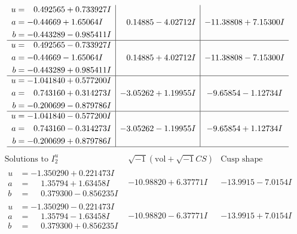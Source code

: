 \documentclass[1p]{elsarticle_modified}
\theoremstyle{definition}
\newcommand{\I}{\sqrt{-1}}
\begin{document}
$$\begin{array}{c|c|c}
\begin{aligned}
u &= \phantom{-}0.492565 + 0.733927 I \\
a &= -0.44669 + 1.65064 I \\
b &= -0.443289 - 0.985411 I\end{aligned}
 & \phantom{-}0.14885 - 4.02712 I & -11.38808 + 7.15300 I \\ \hline\begin{aligned}
u &= \phantom{-}0.492565 - 0.733927 I \\
a &= -0.44669 - 1.65064 I \\
b &= -0.443289 + 0.985411 I\end{aligned}
 & \phantom{-}0.14885 + 4.02712 I & -11.38808 - 7.15300 I \\ \hline\begin{aligned}
u &= -1.041840 + 0.577200 I \\
a &= \phantom{-}0.743160 + 0.314273 I \\
b &= -0.200699 - 0.879786 I\end{aligned}
 & -3.05262 + 1.19955 I & -9.65854 - 1.12734 I \\ \hline\begin{aligned}
u &= -1.041840 - 0.577200 I \\
a &= \phantom{-}0.743160 - 0.314273 I \\
b &= -0.200699 + 0.879786 I\end{aligned}
 & -3.05262 - 1.19955 I & -9.65854 + 1.12734 I\\
 \hline 
 \end{array}$$\newpage$$\begin{array}{c|c|c}  
\text{Solutions to }I^u_{2}& \I (\text{vol} + \sqrt{-1}CS) & \text{Cusp shape}\\
 \hline 
\begin{aligned}
u &= -1.350290 + 0.221473 I \\
a &= \phantom{-}1.35794 + 1.63458 I \\
b &= \phantom{-}0.379300 - 0.856235 I\end{aligned}
 & -10.98820 + 6.37771 I & -13.9915 - 7.0154 I \\ \hline\begin{aligned}
u &= -1.350290 - 0.221473 I \\
a &= \phantom{-}1.35794 - 1.63458 I \\
b &= \phantom{-}0.379300 + 0.856235 I\end{aligned}
 & -10.98820 - 6.37771 I & -13.9915 + 7.0154 I \\ \hline\begin{aligned}

\end{aligned}
\end{array}$$
\end{document}
